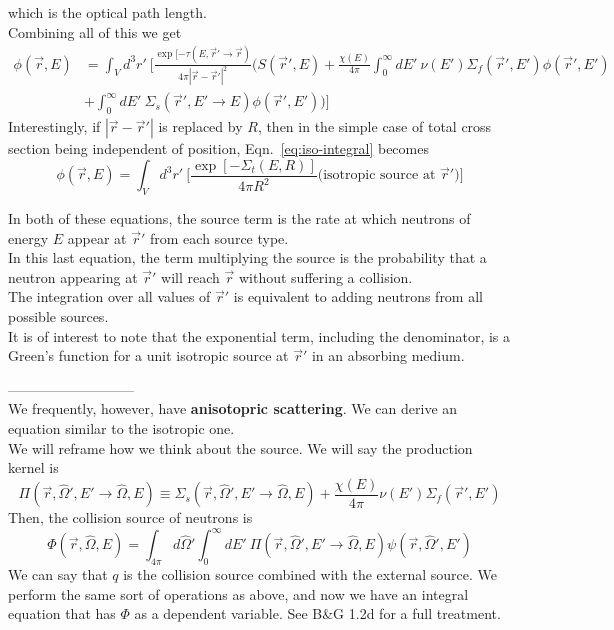 \documentclass[12pt]{article}
\newcommand{\rvec}{\ensuremath{\vec{r}}}
\newcommand{\vOmega}{\ensuremath{\hat{\Omega}}}
\begin{document}
which is the optical path length. \\
Combining all of this we get
\begin{align}
\phi(\rvec,E) &= \int_V d^3r' \: \biggl[\frac{\exp[-\tau(E,\vec{r}' \rightarrow \vec{r})}{4\pi|\vec{r} - \vec{r}'|^2} \biggl(S(\vec{r}',E) + \frac{\chi(E)}{4\pi} \int_0^{\infty} dE' \: \nu(E') \Sigma_f(\rvec', E')\phi(\vec{r}', E') \nonumber \\
&+ \int_0^{\infty} dE'\:\Sigma_s(\rvec',E' \rightarrow E) \phi(\rvec',E') \biggr)  \biggr]
\label{eq:iso-integral}
\end{align}
%
Interestingly, if $|\vec{r} - \vec{r}'|$ is replaced by $R$, then in the simple case of total cross section being independent of position, Eqn.~\ref{eq:iso-integral} becomes
\[\phi(\rvec,E) = \int_V d^3r' \: \biggl[\frac{\exp[-\Sigma_t(E, R)]}{4\pi R^2} \biggl( \text{isotropic source at }\vec{r}' \biggr)\biggr]\]

In both of these equations, the source term is the rate at which neutrons of energy $E$ appear at $\vec{r}'$ from each source type. \\
In this last equation, the term multiplying the source is the probability that a neutron appearing at $\vec{r}'$ will reach $\vec{r}$ without suffering a collision.\\
The integration over all values of $\vec{r}'$ is equivalent to adding neutrons from all possible sources. \\
It is of interest to note that the exponential term, including the denominator, is a Green's function for a unit isotropic source at $\vec{r}'$ in an absorbing medium.

---------------------------\\
We frequently, however, have \textbf{anisotopric scattering}. We can derive an equation similar to the isotropic one.\\
We will reframe how we think about the source. We will say the production kernel is
%
\[\Pi(\rvec, \vOmega',E' \rightarrow \vOmega, E) \equiv \Sigma_s(\rvec, \vOmega',E' \rightarrow \vOmega, E) + \frac{\chi(E)}{4\pi} \nu(E') \Sigma_f(\rvec', E')\]
Then, the collision source of neutrons is
\[\Phi(\vec{r}, \vOmega, E) = \int_{4\pi} d\vOmega' \int_0^{\infty} dE' \: \Pi(\rvec, \vOmega',E' \rightarrow \vOmega, E) \psi(\rvec, \vOmega', E')\]
%
We can say that $q$ is the collision source combined with the external source. We perform the same sort of operations as above, and now we have an integral equation that has $\Phi$ as a dependent variable. See B\&G 1.2d for a full treatment.
\end{document}
